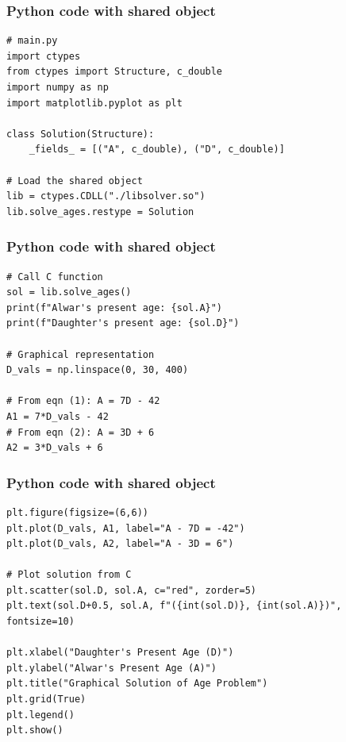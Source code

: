 \documentclass{beamer}
\begin{document}
\begin{frame}[fragile]
\frametitle{Python code with shared object}
\begin{lstlisting}
# main.py
import ctypes
from ctypes import Structure, c_double
import numpy as np
import matplotlib.pyplot as plt

class Solution(Structure):
    _fields_ = [("A", c_double), ("D", c_double)]

# Load the shared object
lib = ctypes.CDLL("./libsolver.so")
lib.solve_ages.restype = Solution
\end{lstlisting}
\end{frame}
\begin{frame}[fragile]
\frametitle{Python code with shared object}
\begin{lstlisting}
# Call C function
sol = lib.solve_ages()
print(f"Alwar's present age: {sol.A}")
print(f"Daughter's present age: {sol.D}")

# Graphical representation
D_vals = np.linspace(0, 30, 400)

# From eqn (1): A = 7D - 42
A1 = 7*D_vals - 42
# From eqn (2): A = 3D + 6
A2 = 3*D_vals + 6
\end{lstlisting}
\end{frame}
\begin{frame}[fragile]
\frametitle{Python code with shared object}
\begin{lstlisting}
plt.figure(figsize=(6,6))
plt.plot(D_vals, A1, label="A - 7D = -42")
plt.plot(D_vals, A2, label="A - 3D = 6")

# Plot solution from C
plt.scatter(sol.D, sol.A, c="red", zorder=5)
plt.text(sol.D+0.5, sol.A, f"({int(sol.D)}, {int(sol.A)})", fontsize=10)

plt.xlabel("Daughter's Present Age (D)")
plt.ylabel("Alwar's Present Age (A)")
plt.title("Graphical Solution of Age Problem")
plt.grid(True)
plt.legend()
plt.show()
\end{lstlisting}
\end{frame}
\end{document}
